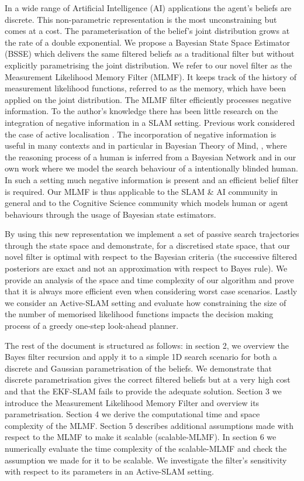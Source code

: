 \documentclass{frontiersSCNS} %
\begin{document}
In a wide range of Artificial Intelligence (AI) applications the agent's beliefs are discrete. This non-parametric representation
is the most unconstraining but comes at a cost. The parameterisation of the belief's joint distribution grows at the rate of a double exponential.
We propose a Bayesian State  Space Estimator (BSSE) which delivers the same filtered beliefs as a traditional filter but without explicitly parametrising the 
joint distribution. We refer to our novel filter as the Measurement Likelihood Memory Filter (MLMF). 
It keeps track of the history of measurement likelihood functions, referred to as the memory, which 
have been applied on the joint distribution.
The MLMF filter efficiently processes negative information. To the author's knowledge there has been little
research on the integration of negative information in a SLAM setting. Previous work considered the case of active localisation \cite{NegInfoFurtherStudies}.
The incorporation of negative information is useful in many contexts and in particular in Bayesian Theory of Mind, \cite{Bake_Saxe_Tene_2011},
where the reasoning process of a human is inferred from a Bayesian Network and in our own work \cite{deChambrier2013} where we model the 
search behaviour of a intentionally blinded human. In such a setting much negative information is present and an efficient belief filter is required. 
Our MLMF is thus applicable to the SLAM \& AI community in general and to the Cognitive Science community which models human or agent behaviours through 
the usage of Bayesian state estimators.

By using this new representation we implement a set of passive search trajectories through the state 
space and demonstrate, for a discretised state space, that our novel filter is optimal with respect to the Bayesian criteria (the successive
filtered posteriors are exact and not an approximation with respect to Bayes rule). We provide an analysis of the space and time complexity of 
our algorithm and prove that it is always more efficient even when considering worst case scenarios.
Lastly we consider an Active-SLAM setting and evaluate how constraining the size of the number of memorised likelihood 
functions impacts the decision making process of a greedy one-step look-ahead planner.

The rest of the document is structured as follows: in section 2, we overview the Bayes filter recursion and apply it to a simple 
1D search scenario for both a discrete and Gaussian parametrisation of the beliefs. We demonstrate that discrete parametrisation gives
the correct filtered beliefs but at a very high cost and that the EKF-SLAM fails to provide the adequate solution. Section 3 we 
introduce the Measurement Likelihood Memory Filter and overview its parametrisation. Section 4 we derive the computational time and 
space complexity of the MLMF. Section 5 describes additional assumptions made with respect to the MLMF to make it 
scalable (scalable-MLMF). In section 6 we numerically evaluate the time complexity of the scalable-MLMF and check the assumption we made 
for it to be scalable. We investigate the filter's sensitivity with respect to its parameters in an Active-SLAM setting.
\end{document}
